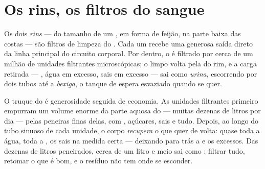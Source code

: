 \section{Os rins, os filtros do sangue}

\begin{definition}\label{def:g7:removing-wastes:kidneys}
Os dois \emph{rins} --- do tamanho de um , em forma de
feijão, na parte baixa das costas --- são filtros de limpeza do
. Cada um recebe uma  generosa saída direto da linha
principal do circuito corporal. Por dentro, o  é filtrado por
cerca de um milhão de unidades filtrantes microscópicas; o 
limpo volta pela  do rim, e a carga retirada --- , água em
excesso, sais em excesso --- sai como \emph{urina},
escorrendo por dois tubos até a \emph{bexiga}, o tanque
de espera esvaziado quando se quer.
\end{definition}

\begin{proposition}\label{prop:g7:removing-wastes:filter}
O truque do  é generosidade seguida de economia. As unidades
filtrantes primeiro empurram um volume enorme da parte aquosa do
 --- muitas dezenas de litros por dia --- pelas peneiras finas
delas, com , açúcares, sais e tudo. Depois, ao longo do tubo
sinuoso de cada unidade, o corpo \emph{recupera} o que quer de volta:
quase toda a água, toda a , os sais na medida certa --- deixando
para trás a  e os excessos. Das dezenas de litros peneirados,
cerca de um litro e meio sai como : filtrar tudo, retomar o que é
bom, e o resíduo não tem onde se esconder.
\end{proposition}
\admitted

